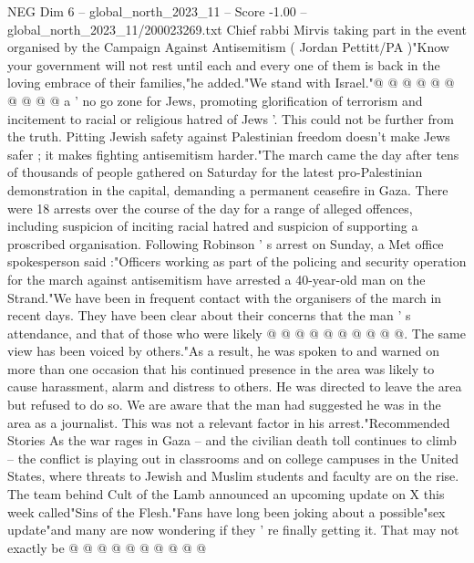 \begin{textsample}{NEG Dim 6 – global\_north\_2023\_11 – Score -1.00 – global\_north\_2023\_11/200023269.txt}
Chief rabbi Mirvis taking part in the event organised by the Campaign Against Antisemitism ( Jordan Pettitt/PA )"Know your government will not rest until each and every one of them is back in the loving embrace of their families,"he added."We stand with Israel."@ @ @ @ @ @ @ @ @ @ a ' no go zone for Jews, promoting glorification of terrorism and incitement to racial or religious hatred of Jews '.
This could not be further from the truth.
Pitting Jewish safety against Palestinian freedom doesn't make Jews safer ; it makes fighting antisemitism harder."The march came the day after tens of thousands of people gathered on Saturday for the latest pro-Palestinian demonstration in the capital, demanding a permanent ceasefire in Gaza.
There were 18 arrests over the course of the day for a range of alleged offences, including suspicion of inciting racial hatred and suspicion of supporting a proscribed organisation.
Following Robinson ' s arrest on Sunday, a Met office spokesperson said :"Officers working as part of the policing and security operation for the march against antisemitism have arrested a 40-year-old man on the Strand."We have been in frequent contact with the organisers of the march in recent days.
They have been clear about their concerns that the man ' s attendance, and that of those who were likely @ @ @ @ @ @ @ @ @ @.
The same view has been voiced by others."As a result, he was spoken to and warned on more than one occasion that his continued presence in the area was likely to cause harassment, alarm and distress to others.
He was directed to leave the area but refused to do so.
We are aware that the man had suggested he was in the area as a journalist.
This was not a relevant factor in his arrest."Recommended Stories As the war rages in Gaza -- and the civilian death toll continues to climb -- the conflict is playing out in classrooms and on college campuses in the United States, where threats to Jewish and Muslim students and faculty are on the rise.
The team behind Cult of the Lamb announced an upcoming update on X this week called"Sins of the Flesh."Fans have long been joking about a possible"sex update"and many are now wondering if they ' re finally getting it.
That may not exactly be @ @ @ @ @ @ @ @ @ @

\end{textsample}
